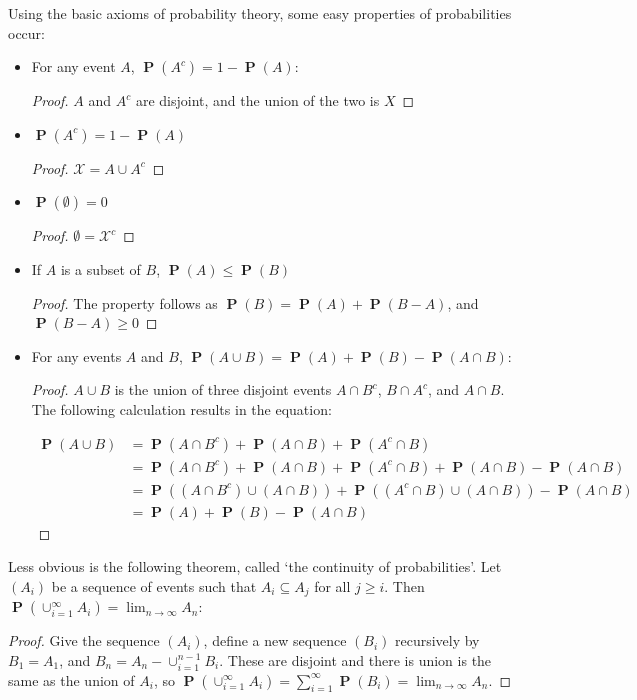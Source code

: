 \documentclass{report}
\DeclareMathOperator{\prob}{\mathbf{P}}
\begin{document}
Using the basic axioms of probability theory, some easy properties of probabilities occur:
\begin{itemize}
    \item For any event $A$, $\prob(A^c) = 1 - \prob(A)$:
    \begin{proof} $A$ and $A^c$ are disjoint, and the union of the two is $X$ \end{proof}

    \item $\prob(A^c) = 1 - \prob(A)$
    \begin{proof} $\mathcal{X} = A \cup A^c$ \end{proof}

    \item $\prob(\emptyset) = 0$
    \begin{proof} $\emptyset = \mathcal{X}^c$ \end{proof}

    \item If $A$ is a subset of $B$, $\prob(A) \leq \prob(B)$
    \begin{proof} The property follows as $\prob(B) = \prob(A) + \prob(B - A)$, and $\prob(B - A) \geq 0$ \end{proof}

    \item For any events $A$ and $B$, $\prob(A \cup B) = \prob(A) + \prob(B) - \prob(A \cap B)$:
    \begin{proof} $A \cup B$ is the union of three disjoint events $A \cap B^c$, $B \cap A^c$, and $A \cap B$. The following calculation results in the equation:

    \begin{align*}
    \prob(A \cup B) &= \prob(A \cap B^c) + \prob(A \cap B) + \prob(A^c \cap B)\\
                    &= \prob(A \cap B^c) + \prob(A \cap B) + \prob(A^c \cap B) + \prob(A \cap B) - \prob(A \cap B)\\
                    &= \prob((A \cap B^c) \cup (A \cap B)) + \prob((A^c \cap B) \cup (A \cap B)) - \prob(A \cap B)\\
                    &= \prob(A) + \prob(B) - \prob(A \cap B)
    \end{align*}
    \end{proof}
\end{itemize}

Less obvious is the following theorem, called `the continuity of probabilities'. Let $(A_i)$ be a sequence of events such that $A_i \subseteq A_j$ for all $j \geq i$. Then $\prob(\cup_{i=1}^\infty A_i) = \lim_{n \to \infty} A_n$:
\begin{proof}
    Give the sequence $(A_i)$, define a new sequence $(B_i)$ recursively by $B_1 = A_1$, and $B_n = A_n - \cup_{i=1}^{n-1} B_i$. These are disjoint and there is union is the same as the union of $A_i$, so $\prob(\cup_{i=1}^\infty A_i) = \sum_{i=1}^\infty \prob(B_i) = \lim_{n \to \infty} A_n$.
\end{proof}
\end{document}
